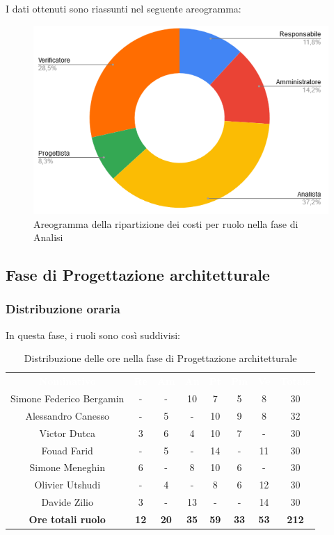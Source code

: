 I dati ottenuti sono riassunti nel seguente areogramma:
\begin{figure}[H]
\centering
\includegraphics[scale=0.60]{img/grafici/torta_fase_analisi_prospetto_economico.png}
\caption{Areogramma della ripartizione dei costi per ruolo nella fase di Analisi}
\end{figure}
 
 
\subsection{Fase di Progettazione architetturale}
\subsubsection{Distribuzione oraria}
In questa fase, i ruoli sono così suddivisi:
\begin{table}[H]
\centering\renewcommand{\arraystretch}{1.5}
\caption{Distribuzione delle ore nella fase di Progettazione architetturale}
\vspace{0.2cm}
\begin{tabular}{ c c c c c c c c }
\rowcolor{redafk}
\textcolor{white}{\textbf{Nominativo}} & \textcolor{white}{\textbf{Re}} &
\textcolor{white}{\textbf{Am}} & \textcolor{white}{\textbf{An}} &
\textcolor{white}{\textbf{Pt}} & \textcolor{white}{\textbf{Pm}} &
\textcolor{white}{\textbf{Ve}} & \textcolor{white}{\textbf{Totale}} \\
Simone Federico Bergamin & - & - & 10 & 7 & 5 & 8 & 30 \\
Alessandro Canesso & - & 5 & - & 10 & 9 & 8 & 32 \\
Victor Dutca & 3 & 6 & 4 & 10 & 7 & - & 30 \\
Fouad Farid & - & 5 & - & 14 & - & 11 & 30 \\
Simone Meneghin & 6 & - & 8 & 10 & 6 & - & 30 \\
Olivier Utshudi & - & 4 & - & 8 & 6 & 12 & 30 \\
Davide Zilio & 3 & - & 13 & - & - & 14 & 30 \\
\rowcolor{lastrowcolor}
\textbf{Ore totali ruolo} & \textbf{12} & \textbf{20} & \textbf{35} & \textbf{59} & \textbf{33} & \textbf{53} & \textbf{212} \\
\end{tabular}
\end{table}
 
